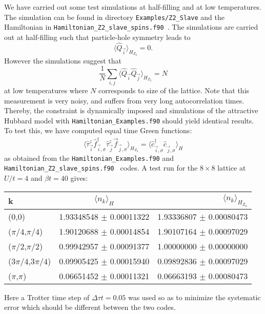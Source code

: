  We have carried out some test simulations at half-filling and at low temperatures.  The simulation can be found in directory \texttt{Examples/Z2\_Slave} and the  Hamiltonian in \texttt{Hamiltonian\_Z2\_slave\_spins.f90 }.  The simulations  are carried out at half-filling such that particle-hole symmetry leads to 
 \begin{equation}
 \langle \hat{Q}_{\vec{i}}    \rangle_{H_{Z_2}} =0.
 \end{equation} 
However the simulations suggest that 
 \begin{equation}
 \frac{1}{N}\sum_{i,j} \langle \hat{Q}_{\vec{i}}   \hat{Q}_{\vec{j}} \rangle_{H_{Z_2}}  = N 
 \end{equation} 
 at low temperatures  where  $N$  corresponds  to size of the lattice.  Note that this measurement is very noisy,  and suffers from very long autocorrelation times.  Thereby, the constraint is dynamically imposed and   simulations of the attractive Hubbard model with  \texttt{Hamiltonian\_Examples.f90}  should yield identical results. To test this,  we have computed equal time Green functions:
\begin{equation}
\langle  \hat{\tau}^{z}_{\vec{i}} \hat{f}^{\dagger}_{\vec{i},\sigma} \hat{\tau}^{z}_{\vec{j}} \vec{f}^{\phantom{\dagger}}_{\vec{j},\sigma} \rangle_{H_{Z_2}} = 
\langle  \hat{c}^{\dagger}_{\vec{i},\sigma} \hat{c}^{\phantom{\dagger}}_{\vec{j},\sigma} \rangle_{H} 
\end{equation}
as obtained  from  the \texttt{Hamiltonian\_Examples.f90} and    \texttt{Hamiltonian\_Z2\_slave\_spins.f90 } codes.  
A test run for the $8\times 8 $ lattice at $U/t = 4$ and $\beta t = 40$ gives: 
\begin{center}
\begin{tabular}{ l | c | r }
 \hline			
   k   &  $\langle n_k \rangle_{H} $  &  $\langle n_k \rangle_{H_{Z_2}} $ \\
  \hline
   (0,0)                               & 1.93348548    $\pm$    0.00011322  & 1.93336807   $\pm$      0.00080473 \\
   ($\pi/4$,$\pi/4$)             & 1.90120688     $\pm$   0.00014854  & 1.90107164    $\pm$     0.00097029  \\
   ($\pi/2$,$\pi/2$)             & 0.99942957     $\pm$   0.00091377  & 1.00000000    $\pm$     0.00000000\\
   ($3\pi/4$,$3\pi/4$)         &  0.09905425     $\pm$   0.00015940 & 0.09892836    $\pm$     0.00097029 \\
   ($\pi$,$\pi$)                   & 0.06651452     $\pm$   0.00011321  & 0.06663193     $\pm$    0.00080473 \\
  \hline  
\end{tabular}

\end{center} 
\vspace*{0.5cm}
Here a Trotter time step of  $\Delta \tau t = 0.05$ was used  so as to minimize the systematic error   which should be different  between the two codes. 

\newpage